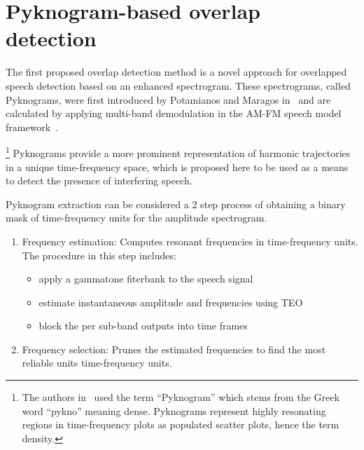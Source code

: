 \section{Pyknogram-based overlap detection}
\label{sec:ch2_Pykno}
The first proposed overlap detection method is a novel approach for overlapped speech detection based on an enhanced spectrogram. 
These spectrograms, called Pyknograms, were first introduced by Potamianos and Maragos in~\cite{potamianos_maragos_icassp95,potamianos_maragos_jasa96} and are calculated by applying multi-band demodulation in the AM-FM speech model framework~\cite{maragos_kaiser_quatieri}.{\footnote{The authors in~\cite{potamianos_maragos_jasa96} used the term ``Pyknogram'' which stems from the Greek word ``pykno'' meaning dense. Pyknograms represent highly resonating regions in time-frequency plots as populated scatter plots, hence the term density.} 
Pyknograms provide a more prominent representation of harmonic trajectories in a unique time-frequency space, which is proposed here to be used as a means to detect the presence of interfering speech.

Pyknogram extraction can be considered a 2 step process of obtaining a binary mask of time-frequency units for the amplitude spectrogram. 
\begin{enumerate}
	\item Frequency estimation: Computes resonant frequencies in time-frequency units. The procedure in this step includes: 
	\begin{itemize}
		\item apply a gammatone fiterbank to the speech signal
		\item estimate instantaneous amplitude and frequencies using TEO
		\item block the per sub-band outputs into time frames
	\end{itemize}
	\item Frequency selection: Prunes the estimated frequencies to find the most reliable units time-frequency units.
\end{enumerate}

}
